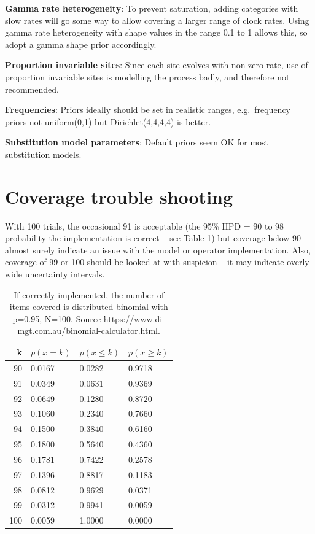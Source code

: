 \documentclass[oneside]{article}
\begin{document}
{\bf Gamma rate heterogeneity}\label{gamma-rate-heterogeneity}:
To prevent saturation, adding categories with slow rates will go some
way to allow covering a larger range of clock rates. Using gamma rate
heterogeneity with shape values in the range 0.1 to 1 allows this, so
adopt a gamma shape prior accordingly.

{\bf Proportion invariable sites}\label{proportion-invariable-sites}:
Since each site evolves with non-zero rate, use of proportion invariable
sites is modelling the process badly, and therefore not recommended.

{\bf Frequencies}\label{frequencies}:
Priors ideally should be set in realistic ranges, e.g.~frequency priors
not uniform(0,1) but Dirichlet(4,4,4,4) is better.

{\bf Substitution model parameters}\label{substitution-model-parameters}:
Default priors seem OK for most substitution models.



\section{Coverage trouble shooting}\label{trouble-shooting}

With 100 trials, the occasional 91 is acceptable (the 95\% HPD = 90 to 98 probability the
implementation is correct -- see Table \ref{tab:coverage}) but coverage below 90 almost surely indicate
an issue with the model or operator implementation. Also, coverage of 99
or 100 should be looked at with suspicion -- it may indicate overly wide
uncertainty intervals.


\begin{table}
\begin{center}
\begin{tabular}{rlll}
\hline
k & $p(x=k)$ & $p(x\le k)$ & $p(x\ge k)$\\
\hline
90 & 0.0167 & 0.0282 & 0.9718\\
91 & 0.0349 & 0.0631 & 0.9369\\
92 & 0.0649 & 0.1280 & 0.8720\\
93 & 0.1060 & 0.2340 & 0.7660\\
94 & 0.1500 & 0.3840 & 0.6160\\
95 & 0.1800 & 0.5640 & 0.4360\\
96 & 0.1781 & 0.7422 & 0.2578\\
97 & 0.1396 & 0.8817 & 0.1183\\
98 & 0.0812 & 0.9629 & 0.0371\\
99 & 0.0312 & 0.9941 & 0.0059\\
100 & 0.0059 & 1.0000 & 0.0000\\
\hline
\end{tabular}
\end{center}
\caption{If correctly implemented, the number of items covered is distributed binomial with p=0.95, N=100.
Source \url{https://www.di-mgt.com.au/binomial-calculator.html}.
\label{tab:coverage}}
\end{table}
\end{document}
